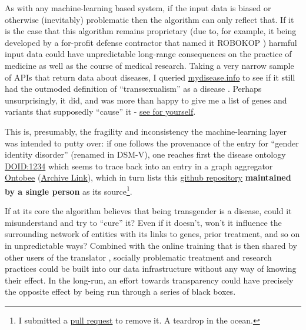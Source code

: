 \documentclass[10pt]{article}
\begin{document}
\begin{multicols}{2}
As with any machine-learning based system, if the input data is biased
or otherwise (inevitably) problematic then the algorithm can only
reflect that. If it is the case that this algorithm remains proprietary
(due to, for example, it being developed by a for-profit defense
contractor that named it ROBOKOP \cite{ROBOKOPCoVar2021} )
harmful input data could have unpredictable long-range consequences on
the practice of medicine as well as the course of medical research.
Taking a very narrow sample of APIs that return data about diseases, I
queried \href{https://mydisease.info}{mydisease.info} to see if it still
had the outmoded definition of ``transsexualism'' as a disease \cite{ramTransphobiaEncodedExamination2021} . Perhaps unsurprisingly, it
did, and was more than happy to give me a list of genes and variants
that supposedly ``cause'' it -
\href{http://mydisease.info/v1/query?q=\%22DOID\%3A10919\%22}{see for
yourself}.

This is, presumably, the fragility and inconsistency the
machine-learning layer was intended to putty over: if one follows the
provenance of the entry for ``gender identity disorder'' (renamed in
DSM-V), one reaches first the disease ontology
\href{https://web.archive.org/web/20211007053446/https://www.ebi.ac.uk/ols/ontologies/doid/terms?iri=http\%3A\%2F\%2Fpurl.obolibrary.org\%2Fobo\%2FDOID_1234}{DOID:1234}
which seems to trace back into an entry in a graph aggregator
\href{http://www.ontobee.org/ontology/DOID?iri=http://purl.obolibrary.org/obo/DOID_1234}{Ontobee}
(\href{https://web.archive.org/web/20210923110103/http://www.ontobee.org/ontology/DOID?iri=http://purl.obolibrary.org/obo/DOID_1234}{Archive
Link}), which in turn lists this
\href{https://github.com/jannahastings/mental-functioning-ontology}{github
repository} \textbf{maintained by a single person} as its
source\footnote{I submitted a
  \href{https://github.com/jannahastings/mental-functioning-ontology/pull/8}{pull
  request} to remove it. A teardrop in the ocean.}.

If at its core the algorithm believes that being transgender is a
disease, could it misunderstand and try to ``cure'' it? Even if it
doesn't, won't it influence the surrounding network of entities with its
links to genes, prior treatment, and so on in unpredictable ways?
Combined with the online training that is then shared by other users of
the translator \cite{consortiumUniversalBiomedicalData2019} ,
socially problematic treatment and research practices could be built
into our data infrastructure without any way of knowing their effect. In
the long-run, an effort towards transparency could have precisely the
opposite effect by being run through a series of black boxes.


\end{multicols}
\end{document}
